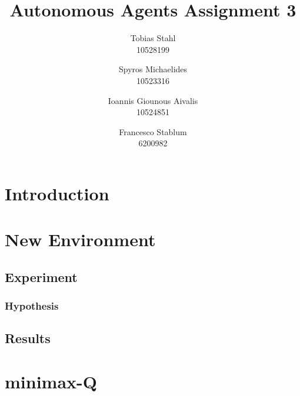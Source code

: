 \documentclass[a4paper,10pt]{article}
\title{
	\textbf{Autonomous Agents Assignment 3}
}
\author{Tobias Stahl \\ 10528199 \and Spyros Michaelides \\ 10523316 \and Ioannis Giounous Aivalis \\ 10524851 \and Francesco Stablum \\ 6200982}
\begin{document}
\maketitle


\section{Introduction}







\section{New Environment}


\subsection{Experiment}



\subsubsection{Hypothesis}


\subsection{Results}









\section{minimax-Q}
\end{document}
